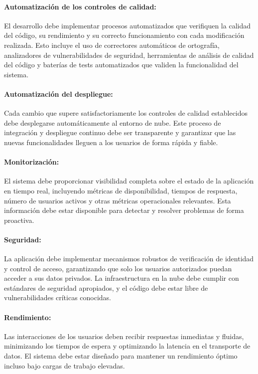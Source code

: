 \paragraph{Automatización de los controles de calidad:}
El desarrollo debe implementar procesos automatizados que verifiquen la calidad del código, su rendimiento y su correcto funcionamiento con cada modificación realizada. Esto incluye el uso de correctores automáticos de ortografía, analizadores de vulnerabilidades de seguridad, herramientas de análisis de calidad del código y baterías de tests automatizados que validen la funcionalidad del sistema.

\paragraph{Automatización del despliegue:}
Cada cambio que supere satisfactoriamente los controles de calidad establecidos debe desplegarse automáticamente al entorno de nube. Este proceso de integración y despliegue continuo debe ser transparente y garantizar que las nuevas funcionalidades lleguen a los usuarios de forma rápida y fiable.

\paragraph{Monitorización:}
El sistema debe proporcionar visibilidad completa sobre el estado de la aplicación en tiempo real, incluyendo métricas de disponibilidad, tiempos de respuesta, número de usuarios activos y otras métricas operacionales relevantes. Esta información debe estar disponible para detectar y resolver problemas de forma proactiva.

\paragraph{Seguridad:}
La aplicación debe implementar mecanismos robustos de verificación de identidad y control de acceso, garantizando que solo los usuarios autorizados puedan acceder a sus datos privados. La infraestructura en la nube debe cumplir con estándares de seguridad apropiados, y el código debe estar libre de vulnerabilidades críticas conocidas.

\paragraph{Rendimiento:}
Las interacciones de los usuarios deben recibir respuestas inmediatas y fluidas, minimizando los tiempos de espera y optimizando la latencia en el transporte de datos. El sistema debe estar diseñado para mantener un rendimiento óptimo incluso bajo cargas de trabajo elevadas.

